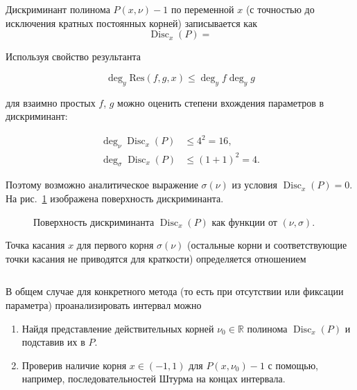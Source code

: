 \documentclass[14pt]{report}
\begin{document}
Дискриминант полинома $P(x,\nu)-1$ по переменной $x$ (с точностью до исключения кратных постоянных корней) записывается как
\begin{dmath}
\operatorname{Disc}_x(P) = 
\label{eq:discriminant}
\end{dmath}


Используя свойство результанта

\[
\deg_y\mathrm{Res}(f,g,x) \leq \deg_y{f}\deg_y{g}
\]

для взаимно простых $f$, $g$ можно оценить степени вхождения параметров в дискриминант:

\begin{align}
\deg_{\nu} \operatorname{Disc}_x(P) & \le 4^2 = 16,\\[1em]
\deg_{\sigma} \operatorname{Disc}_x(P) & \le (1 + 1)^2 = 4.
\end{align}

Поэтому возможно аналитическое выражение $\sigma(\nu)$ из условия $\operatorname{Disc}_x(P)=0$. На рис.~\ref{fig:discriminant-surface} изображена поверхность дискриминанта.

\begin{figure}[hb]
\centering
\scalebox{.6}{}
\caption{Поверхность дискриминанта $\operatorname{Disc}_x(P)$ как функции от $(\nu,\sigma)$.}
\label{fig:discriminant-surface}
\end{figure}

Точка касания $x$ для первого корня $\sigma(\nu)$ (остальные корни и соответствующие точки касания не приводятся для краткости) определяется отношением

\[

\]

В общем случае для конкретного метода (то есть при отсутствии или фиксации параметра) проанализировать интервал можно

\vspace{1em}

\begin{enumerate}
\item Найдя представление действительных корней $\nu_0 \in \mathbb{R}$ полинома $\operatorname{Disc}_x(P)$ и подставив их в $P$.

\vspace{0.5em}

\item Проверив наличие корня $x \in (-1, 1)$ для $P(x,\nu_0)-1$ с помощью, например, последовательностей Штурма на концах интервала.
\end{enumerate}
\end{document}
